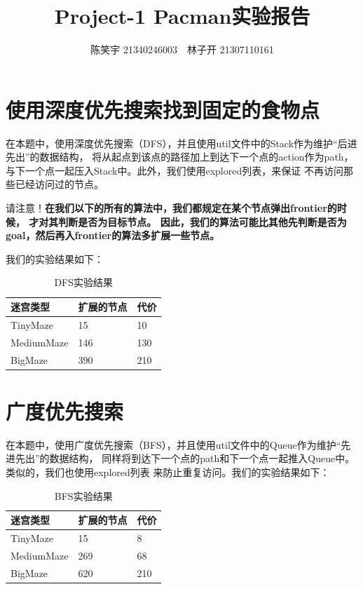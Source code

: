 \documentclass{article}
\title{Project-1 Pacman实验报告}
\author{陈笑宇 21340246003$\quad$林子开 21307110161}
\date{}
\begin{document}
	\maketitle

\section{使用深度优先搜索找到固定的食物点}
在本题中，使用深度优先搜索（DFS），并且使用util文件中的Stack作为维护“后进先出”的数据结构，
将从起点到该点的路径加上到达下一个点的action作为path，
与下一个点一起压入Stack中。此外，我们使用explored列表，来保证
不再访问那些已经访问过的节点。

请注意！\textbf{在我们以下的所有的算法中，我们都规定在某个节点弹出frontier的时候，
才对其判断是否为目标节点。
因此，我们的算法可能比其他先判断是否为goal，然后再入frontier的算法多扩展一些节点。}

我们的实验结果如下：

\begin{table}[H]
	\centering
	\caption{DFS实验结果}
	\begin{tabular}{lll}
	\hline
	迷宫类型       & 扩展的节点 & 代价  \\
	\hline
	TinyMaze   & 15    & 10  \\
	MediumMaze & 146   & 130 \\
	BigMaze    & 390   & 210\\
	\hline
	\end{tabular}
	\end{table}

\section{广度优先搜索}
在本题中，使用广度优先搜索（BFS），并且使用util文件中的Queue作为维护“先进先出”的数据结构，
同样将到达下一个点的path和下一个点一起推入Queue中。类似的，我们也使用explored列表
来防止重复访问。我们的实验结果如下：
\begin{table}[H]
	\centering
	\caption{BFS实验结果}
	\begin{tabular}{lll}
		\hline
	迷宫类型       & 扩展的节点 & 代价  \\ \hline
	TinyMaze   & 15    & 8   \\
	MediumMaze & 269   & 68  \\
	BigMaze    & 620   & 210 \\ \hline
	\end{tabular}
	\end{table}
\end{document}
